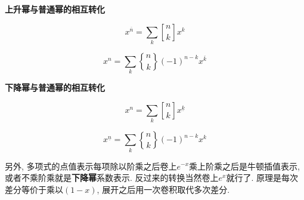 \textbf{上升幂与普通幂的相互转化}

$$ x^{\overline{n}}=\sum_{k} {n \brack k} x^k $$

$$ x^n=\sum_{k} {n \brace k} (-1)^{n-k} x^{\overline{k}} $$

\textbf{下降幂与普通幂的相互转化}

$$ x^n=\sum_{k} {n \brack k} x^{\underline{k}} $$

$$ x^{\underline{n}}=\sum_{k} {n \brace k} (-1)^{n-k} x^k $$

另外, 多项式的点值表示每项除以阶乘之后卷上$e^{-x}$乘上阶乘之后是牛顿插值表示, 或者不乘阶乘就是\textbf{下降幂}系数表示. 反过来的转换当然卷上$e^x$就行了. 原理是每次差分等价于乘以$(1 - x)$, 展开之后用一次卷积取代多次差分.